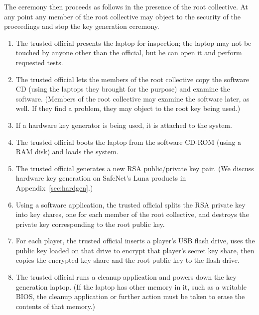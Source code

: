 {{\noindent The ceremony then proceeds as follows in the presence of the root collective. At any point any member of the root collective may object to the security of the proceedings and stop the key generation ceremony.}
\begin{enumerate}
\item The trusted official presents the laptop for inspection; the laptop may not be touched by anyone other than the official, but he can open it and perform requested tests.
\item The trusted official lets the members of the root collective copy the software CD (using the laptops they brought for the purpose) and examine the software. (Members of the root collective may examine the software later, as well. If they find a problem, they may object to the root key being used.)
\item If a hardware key generator is being used, it is attached to the system. 
\item The trusted official boots the laptop from the software CD-ROM (using a RAM disk) and loads the system.
\item The trusted official generates a new RSA public/private key pair. (We discuss hardware key generation on SafeNet's Luna products in Appendix~\ref{sec:hardgen}.)
\item Using a software application, the trusted official splits the RSA private key into key shares, one for each member of the root collective, and destroys the private key corresponding to the root public key.
\item For each player, the trusted official inserts a player's USB flash drive, uses the public key loaded on that drive to encrypt that player's secret key share, then copies the encrypted key share and the root public key  to the flash drive. 
\item The trusted official runs a cleanup application and powers down the key generation laptop. (If the laptop has other memory in it, such as a writable BIOS, the cleanup application or further action must be taken to erase the contents of that memory.)
\end{enumerate}

}